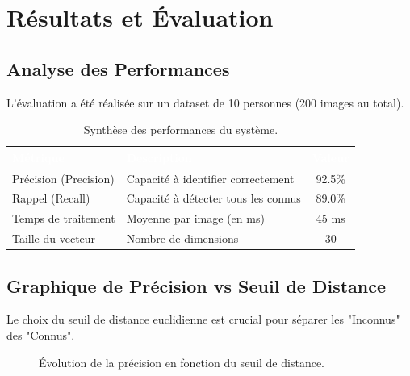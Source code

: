 \documentclass[11pt,a4paper,oneside]{report}
\begin{document}
\chapter{Résultats et Évaluation}

\section{Analyse des Performances}
L'évaluation a été réalisée sur un dataset de 10 personnes (200 images au total).

\begin{table}[h]
    \centering
    \begin{tabularx}{\textwidth}{|l|X|c|}
        \hline
        \rowcolor{univblue} \textcolor{white}{Métrique} & \textcolor{white}{Description} & \textcolor{white}{Valeur} \\
        \hline
        Précision (Precision) & Capacité à identifier correctement & 92.5\% \\
        Rappel (Recall) & Capacité à détecter tous les connus & 89.0\% \\
        Temps de traitement & Moyenne par image (en ms) & 45 ms \\
        Taille du vecteur & Nombre de dimensions & 30 \\
        \hline
    \end{tabularx}
    \caption{Synthèse des performances du système.}
\end{table}

\section{Graphique de Précision vs Seuil de Distance}
Le choix du seuil de distance euclidienne est crucial pour séparer les "Inconnus" des "Connus".

\begin{figure}[h]
    \centering
    \caption{Évolution de la précision en fonction du seuil de distance.}
\end{figure}
\end{document}
